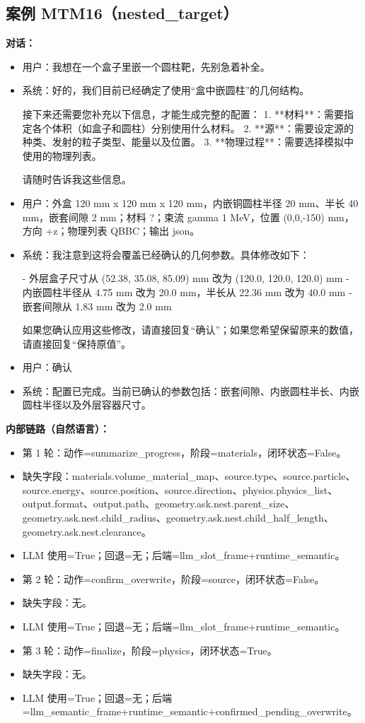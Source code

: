 \documentclass[11pt]{ctexart}
\begin{document}
\subsection{案例 MTM16（nested\_target）}
\textbf{对话：}
\begin{itemize}
\item 用户：我想在一个盒子里嵌一个圆柱靶，先别急着补全。
\item 系统：好的，我们目前已经确定了使用“盒中嵌圆柱”的几何结构。

接下来还需要您补充以下信息，才能生成完整的配置：
1.  **材料**：需要指定各个体积（如盒子和圆柱）分别使用什么材料。
2.  **源**：需要设定源的种类、发射的粒子类型、能量以及位置。
3.  **物理过程**：需要选择模拟中使用的物理列表。

请随时告诉我这些信息。
\item 用户：外盒 120 mm x 120 mm x 120 mm，内嵌铜圆柱半径 20 mm、半长 40 mm，嵌套间隙 2 mm；材料 ?；束流 gamma 1 MeV，位置 (0,0,-150) mm，方向 +z；物理列表 QBBC；输出 json。
\item 系统：我注意到这将会覆盖已经确认的几何参数。具体修改如下：

- 外层盒子尺寸从 (52.38, 35.08, 85.09) mm 改为 (120.0, 120.0, 120.0) mm
- 内嵌圆柱半径从 4.75 mm 改为 20.0 mm，半长从 22.36 mm 改为 40.0 mm
- 嵌套间隙从 1.83 mm 改为 2.0 mm

如果您确认应用这些修改，请直接回复“确认”；如果您希望保留原来的数值，请直接回复“保持原值”。
\item 用户：确认
\item 系统：配置已完成。当前已确认的参数包括：嵌套间隙、内嵌圆柱半长、内嵌圆柱半径以及外层容器尺寸。
\end{itemize}
\textbf{内部链路（自然语言）：}
\begin{itemize}
\item 第 1 轮：动作=summarize\_progress，阶段=materials，闭环状态=False。
\item 缺失字段：materials.volume\_material\_map、source.type、source.particle、source.energy、source.position、source.direction、physics.physics\_list、output.format、output.path、geometry.ask.nest.parent\_size、geometry.ask.nest.child\_radius、geometry.ask.nest.child\_half\_length、geometry.ask.nest.clearance。
\item LLM 使用=True；回退=无；后端=llm\_slot\_frame+runtime\_semantic。
\item 第 2 轮：动作=confirm\_overwrite，阶段=source，闭环状态=False。
\item 缺失字段：无。
\item LLM 使用=True；回退=无；后端=llm\_slot\_frame+runtime\_semantic。
\item 第 3 轮：动作=finalize，阶段=physics，闭环状态=True。
\item 缺失字段：无。
\item LLM 使用=True；回退=无；后端=llm\_semantic\_frame+runtime\_semantic+confirmed\_pending\_overwrite。
\end{itemize}
\end{document}
